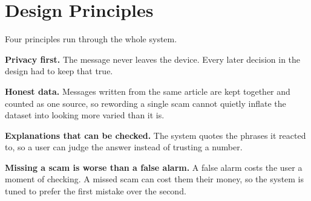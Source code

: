 \section{Design Principles}

Four principles run through the whole system.

\textbf{Privacy first.} The message never leaves the device. Every later decision in the design had to keep that true.

\textbf{Honest data.} Messages written from the same article are kept together and counted as one source, so rewording a single scam cannot quietly inflate the dataset into looking more varied than it is.

\textbf{Explanations that can be checked.} The system quotes the phrases it reacted to, so a user can judge the answer instead of trusting a number.

\textbf{Missing a scam is worse than a false alarm.} A false alarm costs the user a moment of checking. A missed scam can cost them their money, so the system is tuned to prefer the first mistake over the second.
